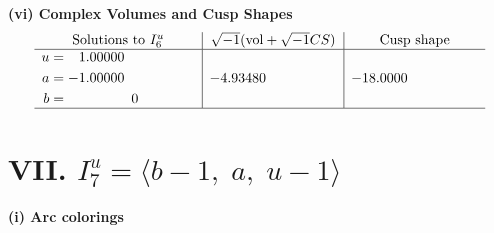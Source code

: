 \documentclass[1p]{elsarticle_modified}
\theoremstyle{definition}
\newcommand{\I}{\sqrt{-1}}
\begin{document}
\newpage\flushleft \textbf{(vi) Complex Volumes and Cusp Shapes}
$$\begin{array}{c|c|c}  
\text{Solutions to }I^u_{6}& \I (\text{vol} + \sqrt{-1}CS) & \text{Cusp shape}\\
 \hline 
\begin{aligned}
u &= \phantom{-}1.00000\phantom{ +0.000000I} \\
a &= -1.00000\phantom{ +0.000000I} \\
b &= \phantom{-0.000000 } 0\end{aligned}
 & -4.93480\phantom{ +0.000000I} & -18.0000\phantom{ +0.000000I}\\
 \hline 
 \end{array}$$\newpage\newpage\renewcommand{\arraystretch}{1}
\centering \section*{VII. $I^u_{7}= \langle b-1,\;a,\;u-1 \rangle$}
\flushleft \textbf{(i) Arc colorings}\\
\end{document}
